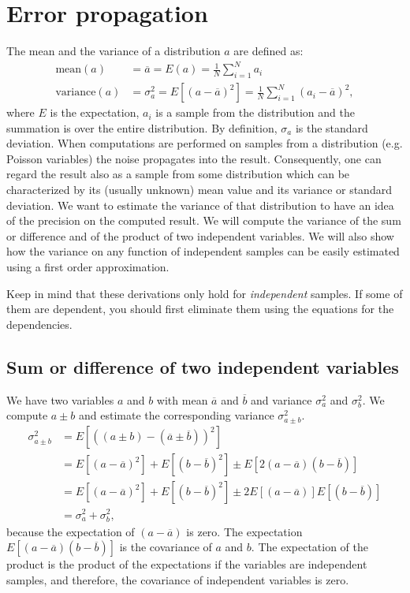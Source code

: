 \documentclass[11pt,oneside]{book}
\begin{document}
\newpage
\section{Error propagation} \label{app:error}
The mean and the variance of a distribution $a$ are defined as:
\begin{align}
  \mbox{mean}(a) &= \overline{a} = E(a) = \frac{1}{N} \sum_{i=1}^N a_i\\
  \mbox{variance}(a) &= \sigma_a^2 = E\left[ (a - \overline{a})^2 \right]
   = \frac{1}{N} \sum_{i=1}^N (a_i - \overline{a})^2,
\end{align}
where $E$ is the expectation, $a_i$ is a sample from the distribution and the
summation is over the entire distribution. By definition, $\sigma_a$ is the
standard deviation. When computations are performed on samples from a
distribution (e.g. Poisson variables) the noise propagates into the
result. Consequently, one can regard the result also as a sample from some
distribution which can be characterized by its (usually unknown) mean value
and its variance or standard deviation. We want to estimate the variance of
that distribution to have an idea of the precision on the computed result. We
will compute the variance of the sum or difference and of the product of two
independent variables. We will also show how the variance on any function of
independent samples can be easily estimated using a first order approximation.

Keep in mind that these derivations only hold for {\em independent}
samples. If some of them are dependent, you should first eliminate them using
the equations for the dependencies.

\subsection{Sum or difference of two independent variables}
We have two variables $a$ and $b$ with mean $\overline{a}$ and $\overline{b}$
and variance $\sigma_a^2$ and $\sigma_b^2$. We compute $a \pm b$ and estimate
the corresponding variance $\sigma_{a \pm b}^2$.
\begin{align}
\sigma_{a \pm b}^2 &= E\left[\left((a \pm b) - (\overline{a} \pm \overline{b}) \right)^2\right]
           \nonumber\\
 &= E\left[(a-\overline{a})^2\right] + E\left[(b-\overline{b})^2\right] \pm E\left[2(a-\overline{a})(b-\overline{b})\right]
           \nonumber\\
 &= E\left[(a-\overline{a})^2\right] + E\left[(b-\overline{b})^2\right] \pm 2 E\left[(a-\overline{a})\right]E\left[(b-\overline{b})\right]
           \nonumber\\
 &= \sigma_a^2 + \sigma_b^2, \label{eq:app_sumerror}
\end{align}
because the expectation of $(a - \overline{a})$ is zero. The expectation
$E\left[(a-\overline{a})(b-\overline{b})\right]$ is the covariance of $a$ and $b$. The
expectation of the product is the product of the expectations if the
variables are independent samples, and therefore, the covariance of
independent variables is zero.
\end{document}
